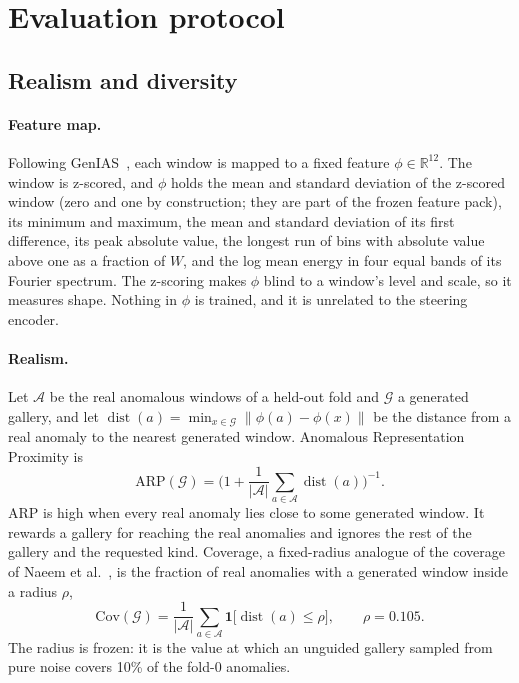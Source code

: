 \documentclass[11pt,a4paper]{article}
\newcommand{\R}{\mathbb{R}}
\newcommand{\phivec}{\phi}                 %
\newcommand{\setA}{\mathcal{A}}            %
\newcommand{\setG}{\mathcal{G}}            %
\newcommand{\norm}[1]{\lVert #1 \rVert}
\DeclareMathOperator{\dist}{dist}
\begin{document}
\section{Evaluation protocol}
\label{sec:eval}

\subsection{Realism and diversity}
\label{sec:realism-metrics}

\paragraph{Feature map.}
Following GenIAS~\cite{genias2025}, each window is mapped to a fixed feature
$\phivec \in \R^{12}$. The window is z-scored, and $\phivec$ holds the mean
and standard deviation of the z-scored window (zero and one by construction;
they are part of the frozen feature pack), its minimum and maximum, the mean
and standard deviation of its first difference, its peak absolute value, the
longest run of bins with absolute value above one as a fraction of $W$, and
the log mean energy in four equal bands of its Fourier spectrum. The z-scoring
makes $\phivec$ blind to a window's level and scale, so it measures shape.
Nothing in $\phivec$ is trained, and it is unrelated to the steering encoder.

\paragraph{Realism.}
Let $\setA$ be the real anomalous windows of a held-out fold and $\setG$ a
generated gallery, and let
$\dist(a) = \min_{x \in \setG} \norm{\phivec(a) - \phivec(x)}$ be the distance
from a real anomaly to the nearest generated window. Anomalous Representation
Proximity is
\begin{equation}
\label{eq:arp}
\mathrm{ARP}(\setG)
  = \biggl(1 + \frac{1}{\lvert \setA\rvert}\sum_{a \in \setA} \dist(a)\biggr)^{-1}.
\end{equation}
ARP is high when every real anomaly lies close to some generated window. It
rewards a gallery for reaching the real anomalies and ignores the rest of the
gallery and the requested kind. Coverage, a fixed-radius analogue of the
coverage of Naeem et al.~\cite{naeem2020prdc}, is the fraction of real
anomalies with a generated window inside a radius $\rho$,
\begin{equation}
\label{eq:cov}
\mathrm{Cov}(\setG)
  = \frac{1}{\lvert \setA\rvert}
    \sum_{a \in \setA} \mathbf{1}\bigl[\dist(a) \le \rho\bigr],
\qquad
\rho = 0.105 .
\end{equation}
The radius is frozen: it is the value at which an unguided gallery sampled
from pure noise covers 10\% of the fold-0 anomalies.
\end{document}
